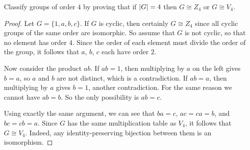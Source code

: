  Classify groups of order $4$ by proving that if
$\lvert{G}\rvert = 4$ then $G\cong Z_4$ or $G\cong V_4$.
\label{exercise:classify:groups-4}
\begin{proof}
  Let $G = \{1,a,b,c\}$. If $G$ is cyclic, then certainly $G\cong Z_4$
  since all cyclic groups of the same order are isomorphic. So assume
  that $G$ is not cyclic, so that no element has order $4$. Since the
  order of each element must divide the order of the group, it follows
  that $a$, $b$, $c$ each have order $2$.

  Now consider the product $ab$. If $ab = 1$, then multiplying by $a$
  on the left gives $b = a$, so $a$ and $b$ are not distinct, which is
  a contradiction. If $ab = a$, then multiplying by $a$ gives $b = 1$,
  another contradiction. For the same reason we cannot have $ab =
  b$. So the only possibility is $ab = c$.

  Using exactly the same argument, we can see that $ba = c$,
  $ac = ca = b$, and $bc = cb = a$. Since $G$ has the same
  multiplication table as $V_4$, it follows that $G\cong V_4$. Indeed,
  any identity-preserving bijection between them is an isomorphism.
\end{proof}

